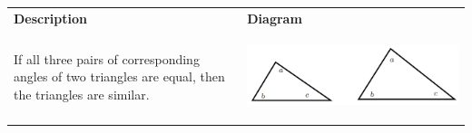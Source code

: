         \begin{center}
      \label{m39368*id318196}
    \noindent
      \tablelasttail{}
      \begin{xtabular*}{\mytablewidth}[t]{|p{10\mystarwidth}|p{10\mystarwidth}|}\hline
                    \textbf{Description}
                   &
                    \textbf{Diagram}
     \tabularnewline{}
        If all three pairs of corresponding angles of two triangles are equal, then the triangles are similar. &
    \setcounter{subfigure}{0}
\label{m39368*id318251}
    \begin{center}
    \label{m39368*id318251!!!underscore!!!media}\label{m39368*id318251!!!underscore!!!printimage}\includegraphics{col11306.imgs/m39368_MG10C13_035.png} %
      \vspace{2pt}
    \vspace{.1in}
    \end{center}    
     \tabularnewline{}

\end{xtabular*}
\end{center}
